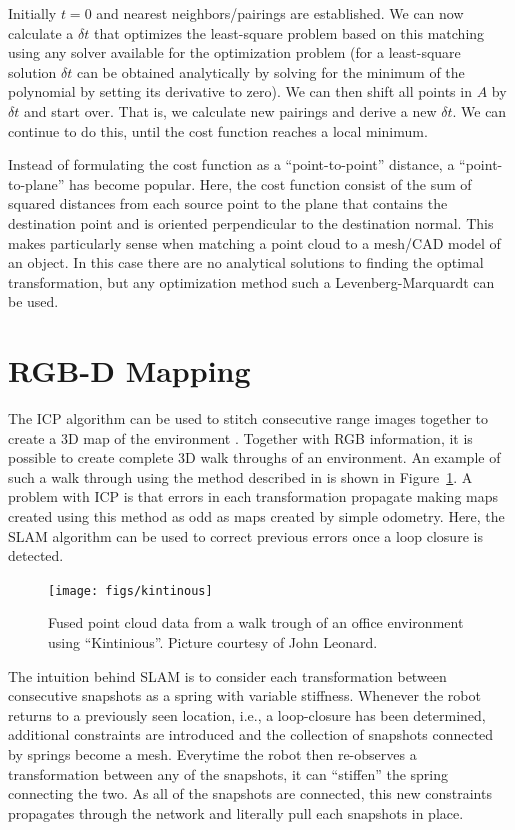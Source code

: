\documentclass[paper=6.14in:9.21in,pagesize=pdftex,11pt,twoside,openright]{scrbook}
\begin{document}
Initially $t=0$ and nearest neighbors/pairings are established. We can now calculate a $ \delta t$ that optimizes the least-square problem based on this matching using any solver available for the optimization problem (for a least-square solution $ \delta t$ can be obtained analytically by solving for the minimum of the polynomial by setting its derivative to zero). We can then shift all points in $ A$ by $ \delta t$ and start over. That is, we calculate new pairings and derive a new $ \delta t$.  We can continue to do this, until the cost function reaches a local minimum.

Instead of formulating the cost function as a ``point-to-point'' distance, a ``point-to-plane'' has become popular. Here, the cost function consist of the sum of squared distances from each source point to the plane that contains the destination point and is oriented perpendicular to the destination normal. This makes particularly sense when matching a point cloud to a mesh/CAD model of an object. In this case there are no analytical solutions to finding the optimal transformation, but any optimization method such a Levenberg-Marquardt can be used.

\section{RGB-D Mapping}
The ICP algorithm can be used to stitch consecutive range images together to create a 3D map of the environment \cite{henry2010rgb}. Together with RGB information, it is possible to create complete 3D walk throughs of an environment. An example of such a walk through using the method described in \cite{whelan2013robust} is shown in Figure~\ref{fig:kintinous}.
A problem with ICP is that errors in each transformation propagate making maps created using this method as odd as maps created by simple odometry. Here, the SLAM algorithm can be used to correct previous errors once a loop closure is detected.


\begin{figure}
\centering
\texttt{[image: figs/kintinous]}
\caption{Fused point cloud data from a walk trough of an office environment using ``Kintinious''. Picture courtesy of John Leonard.\label{fig:kintinous}}
\end{figure}

The intuition behind SLAM is to consider each transformation between consecutive snapshots as a spring with variable stiffness. Whenever the robot returns to a previously seen location, i.e., a loop-closure has been determined, additional constraints are introduced and the collection of snapshots connected by springs become a mesh. Everytime the robot then re-observes a transformation between any of the snapshots, it can ``stiffen'' the spring connecting the two. As all of the snapshots are connected, this new constraints propagates through the network and literally pull each snapshots in place.
\end{document}
